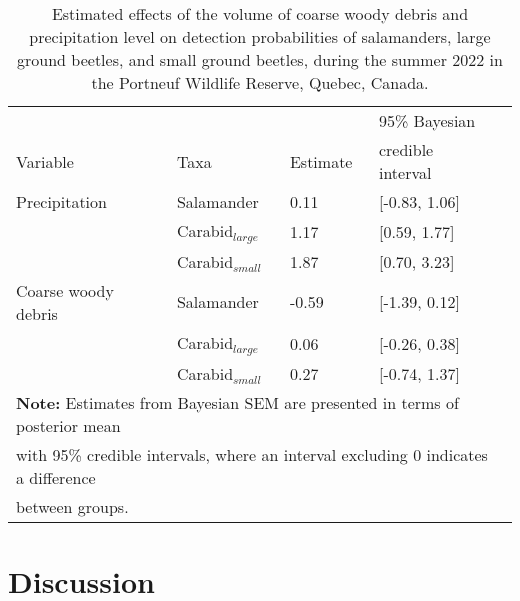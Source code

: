 \begin{table}[ht]
  \centering
  \caption[Estimated effects of the volume of coarse woody debris and precipitation level on detection probabilities of salamanders, large ground beetles, and small ground beetles.]
  {Estimated effects of the volume of coarse woody debris and precipitation level on detection probabilities of salamanders, large ground beetles, and small ground beetles, during the summer 2022 in the Portneuf Wildlife Reserve,  Quebec, Canada.}
  \label{tab:detection}
  \begin{tabular}{lllll} 
      \hline
      &&&95\% Bayesian \\
      Variable & Taxa & Estimate &  credible interval \\ [0.5ex] 
      \hline      
      Precipitation       & Salamander              & \hspace{1mm}0.11 & [-0.83, 1.06] \\ 
                          & Carabid$_{large}$  & \hspace{1mm}1.17 & [0.59, 1.77] \\ 
                          & Carabid$_{small}$        & \hspace{1mm}1.87 & [0.70, 3.23] \\  
      \hline      
      Coarse woody debris & Salamander              & -0.59 & [-1.39, 0.12] \\ 
                          & Carabid$_{large}$  & \hspace{1mm}0.06 & [-0.26, 0.38] \\ 
                          & Carabid$_{small}$        & \hspace{1mm}0.27 & [-0.74, 1.37] \\   

      \hline
      \multicolumn{4}{l}{\textbf{Note:} Estimates from Bayesian SEM are presented in terms of posterior mean} \\
      \multicolumn{4}{l}{with 95\% credible intervals, where an interval excluding 0 indicates a difference} \\
      \multicolumn{4}{l}{between groups.} \\
  \end{tabular}
\end{table}

\clearpage


\section*{Discussion}
\label{sec:discu1}

